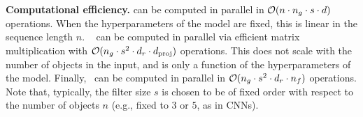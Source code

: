 \textbf{Computational efficiency.}  can be computed in parallel in ${\mathcal{O}}(n \cdot n_g \cdot s \cdot d)$ operations. When the hyperparameters of the model are fixed, this is linear in the sequence length $n$. ~ can be computed in parallel via efficient matrix multiplication with ${\mathcal{O}}(n_g \cdot s^2 \cdot d_r \cdot d_{\mathrm{proj}})$ operations. This does not scale with the number of objects in the input, and is only a function of the hyperparameters of the model. Finally,~ can be computed in parallel in ${\mathcal{O}}(n_g \cdot s^2 \cdot d_r \cdot n_f)$ operations. Note that, typically, the filter size $s$ is chosen to be of fixed order with respect to the number of objects $n$ (e.g., fixed to $3$ or $5$, as in CNNs).